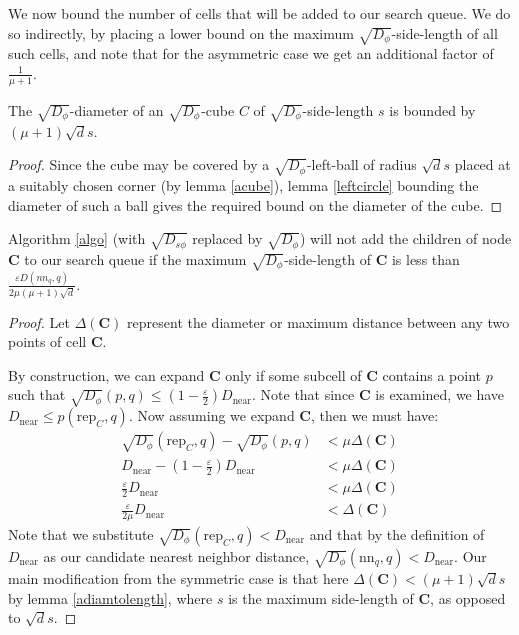 \documentclass[11pt]{myclass}
\newcommand{\breg}{\ensuremath{D_\phi}}
\newcommand{\sbreg}{\ensuremath{D_{s\phi}}}
\newcommand{\eps}{\varepsilon}
\begin{document}
We now bound the number of cells that will be added to our search queue. 
We do so indirectly, by placing a lower bound on the maximum $\sqrt{\breg}$-side-length of all such cells, and note that for the
asymmetric case we get an additional factor of $\frac{1}{\mu+1}$.


\begin{lemma}\label{adiamtolength}
The $\sqrt{\breg}$-diameter of an $\sqrt{\breg}$-cube $C$ of $\sqrt{\breg}$-side-length $s$ is bounded by $(\mu+1) \sqrt{d} s$. 
\end{lemma}
\begin{proof}
Since the cube may be covered by a $\sqrt{\breg}$-left-ball of radius $\sqrt{d} s$ placed at a suitably chosen corner (by lemma \ref{acube}), lemma \ref{leftcircle} bounding the diameter of such a ball gives the required bound on the diameter
of the cube.
\end{proof}

\begin{lemma}\label{depthAsymmetricCube}
Algorithm \ref{algo} (with $\sqrt{\sbreg}$ replaced by $\sqrt{\breg}$) will not add the children of node  $\textbf{C}$ to our search queue 
if the maximum $\sqrt{\breg}$-side-length of $\textbf{C}$ is less than $\frac{\eps D({nn}_q,q)}{2 \mu (\mu+1) \sqrt{d}}$.
\end{lemma}
\begin{proof}
Let $\Delta(\textbf{C})$ represent the diameter or maximum distance between any two points of cell $\textbf{C}$.

By construction, we can expand $\textbf{C}$ only if some subcell of $\textbf{C}$ contains a point $p$ 
such that $\sqrt{\breg}(p , q) \leq (1 - \frac{\eps}{2}) D_{\text{near}}$. Note that since $\textbf{C}$ is examined, 
we have $D_{\text{near}} \leq p(\text{rep}_C , q)$.
 Now assuming we expand $\textbf{C}$, then we must have:
\begin{align*}
 \sqrt{\breg}(\text{rep}_C,q) - \sqrt{\breg}(p, q) &< \mu \Delta(\textbf{C}) \\
D_{\text{near}} - \left(1 - \frac{\eps}{2} \right)D_{\text{near}} &< \mu \Delta(\textbf{C}) \\ 
\frac{\eps}{2} D_{\text{near}} &< \mu \Delta(\textbf{C}) \\
\frac{\eps}{2 \mu} D_{\text{near}} &< \Delta(\textbf{C})
\end{align*}
Note that we substitute $\sqrt{\breg} (\text{rep}_C, q) < D_{\text{near}} $ and that by the definition of $D_{\text{near}}$ 
as our candidate nearest neighbor distance,  $\sqrt{\breg}( \text{nn}_q,q) < D_{\text{near}}$. 
Our main modification from the symmetric case is that here 
$\Delta(\textbf{C}) < (\mu+1)\sqrt{d} s$ by lemma \ref{adiamtolength},  where $s$ is the maximum side-length of $\textbf{C}$, 
as opposed to $\sqrt{d}s$. 
\end{proof}
\end{document}
